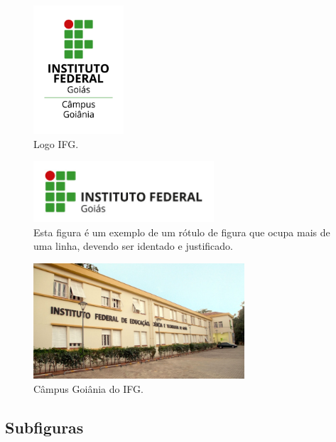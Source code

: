 \begin{figure}[ht!]
 \centering
  \includegraphics[width=0.30\textwidth]{./fig/logo-ifg-vertical-goiania}
 \caption{Logo IFG.}
 \label{fig:exemploFig1}
\end{figure}

\begin{figure}[ht!]
 \centering
 \includegraphics[width=0.60\textwidth]{./fig/logo-ifg}
 \caption{Esta figura é um exemplo de um rótulo de figura que ocupa mais de uma linha, devendo ser identado e justificado.}
 \label{fig:exemploFig2}
\end{figure}

\begin{figure}[H]
 \centering
  \includegraphics[width=0.70\textwidth]{./fig/foto-ifg}
  \caption{Câmpus Goiânia do IFG.}
 \label{fig:exemploFig3}
\end{figure}

\subsection{Subfiguras}
\label{subsec:subfigs} 

